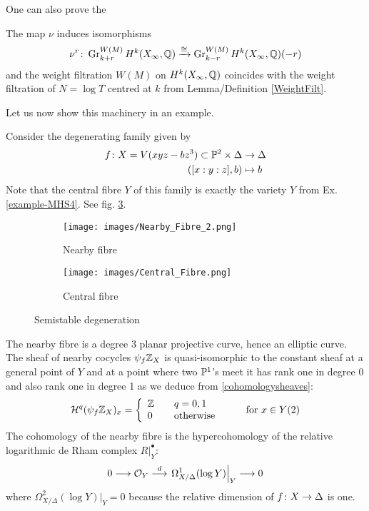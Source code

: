 \documentclass[../main.tex]{subfiles}
\begin{document}
One can also prove the
\begin{theorem}\textup{\cite[Thm 11.40]{PS08}}
     The map $\nu$ induces isomorphisms
     \[
     \nu^r \colon \operatorname{Gr}^{W(M)}_{k+r} H^k(X_\infty, \mathbb{Q}) \xrightarrow{\cong} \operatorname{Gr}^{W(M)}_{k-r} H^k(X_\infty, \mathbb{Q})(-r)
     \]
and the weight filtration $W(M)$ on $H^k(X_\infty, \mathbb{Q})$ coincides with the weight filtration of $N = \log T$ centred at $k$ from Lemma/Definition \ref{WeightFilt}.
\end{theorem}

Let us now show this machinery in an example.


\begin{es} 
\label{example-MHS5}
Consider the degenerating family given by 
\begin{align*}
    f \colon X=V(xyz-bz^3) \subset \mathbb{P}^2 \times \Delta &\to \Delta \\
([x :y : z], b) &\mapsto b \\
\end{align*}
Note that the central fibre $Y$ of this family is exactly the variety $Y$ from Ex. \ref{example-MHS4}. See fig. \ref{fig:f2}.



\begin{figure}[!tbp]
  \begin{subfigure}[b]{0.4\textwidth}
    \texttt{[image: images/Nearby\_Fibre\_2.png]}
    \caption{Nearby fibre}
    \label{fig:f1}
  \end{subfigure}
  \hfill
  \begin{subfigure}[b]{0.4\textwidth}
    \texttt{[image: images/Central\_Fibre.png]}
    \caption{Central fibre}
    \label{fig:f2}
  \end{subfigure}
  \caption{Semistable degeneration}
\end{figure}


The nearby fibre is a degree $3$ planar projective curve, hence an elliptic curve. The sheaf of nearby cocycles $\psi_f \mathbb{Z}_X$ is quasi-isomorphic to the constant sheaf at a general point of $Y$ and at a point where two $\mathbb{P}^1$'s meet it has rank one in degree 0 and also rank one in degree 1 as we deduce from \eqref{cohomologysheaves}:
\[
\mathcal{H}^q(\psi_f \mathbb{Z}_X)_x = \left\{\begin{array}{ll} 
 \mathbb{Z} &\quad q = 0,1 \\ 
0 &\quad \text{otherwise}  \end{array}\right.\\ \qquad \text{ for } x \in Y(2)
\]
The cohomology of the nearby fibre is the hypercohomology of the relative logarithmic de Rham complex $R|_Y^\bullet$:
\[0\longrightarrow\mathcal{O}_Y\stackrel{d}{\longrightarrow} \left.\Omega^1_{X/\Delta}(\log Y)\right|_Y\longrightarrow 0\]
where $\Omega^2_{X/\Delta}(\log Y)|_Y=0$ because the relative dimension of $f\colon X\to\Delta$ is one.


\end{es}
\end{document}
